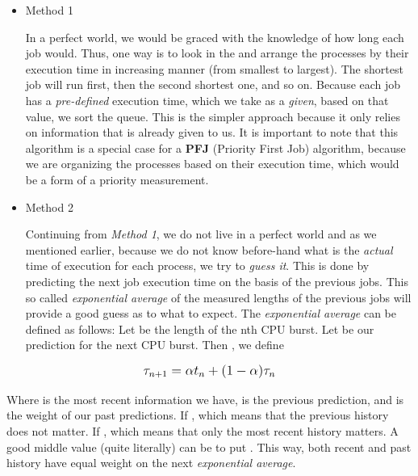 \documentclass{article}
\newcommand{\code}[1]{\codeinline{\texttt{#1}}}
\begin{document}
\begin{itemize}
\item Method 1

In a perfect world, we would be graced with the knowledge of how long each job would. Thus, one way is to look in the \code{ready\_queue} and arrange the processes by their execution time in increasing manner (from smallest to largest). The shortest job will run first, then the second shortest one, and so on. Because each job has a \textit{pre-defined} execution time, which we take as a \textit{given}, based on that value, we sort the queue. This is the simpler approach because it only relies on information that is already given to us. It is important to note that this algorithm is a special case for a \textbf{PFJ} (Priority First Job) algorithm, because we are organizing the processes based on their execution time, which would be a form of a priority measurement.

\item Method 2

Continuing from \textit{Method 1}, we do not live in a perfect world and as we mentioned earlier, because we do not know before-hand what is the \textit{actual} time of execution for each process, we try to \textit{guess it}. This is done by predicting the next job execution time on the basis of the previous jobs. This so called \textit{exponential average} of the measured lengths of the previous jobs will provide a good guess as to what to expect. The \textit{exponential average} can be defined as follows: Let  be the length of the nth CPU burst. Let  be our prediction for the next CPU burst. Then , we define
\end{itemize}

\begin{equation}
  \mathlarger{\tau_{n+1} = \alpha t_{n} + (1 - \alpha)\tau_{n}}
\end{equation}

Where  is the most recent information we have,  is the previous prediction, and \scalebox{1.1}{\(\alpha\)} is the weight of our past predictions. If , which means that the previous history does not matter. If , which means that only the most recent history matters. A good middle value (quite literally) can be to put . This way, both recent and past history have equal weight on the next \textit{exponential average}.
\end{document}
